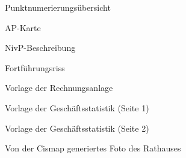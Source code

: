 \begin{figure}[htbp]
	\centering
	\caption{Punktnumerierungsübersicht}
	\label{fig:punktnumerierungsuebersicht}
\end{figure}
\begin{figure}[htbp]
	\centering
	\caption{AP-Karte}
	\label{fig:ap-karte}
\end{figure}
\begin{figure}[htbp]
	\centering
	\caption{NivP-Beschreibung}
	\label{fig:nivp-beschreibung}
\end{figure}
\begin{figure}[htbp]
	\centering
	\caption{Fortführungsriss}
	\label{fig:fortfuehrungsriss}
\end{figure}
\begin{figure}[htbp]
	\centering
	\caption{Vorlage der Rechnungsanlage}
	\label{fig:vorlage_rechnungsanlage}
\end{figure}
\begin{figure}[htbp]
	\centering
	\caption{Vorlage der Geschäftsstatistik (Seite 1)}
	\label{fig:vorlage_geschaeftsstatistik_1}
\end{figure}
\begin{figure}[htbp]
	\centering
	\caption{Vorlage der Geschäftsstatistik (Seite 2)}
	\label{fig:vorlage_geschaeftsstatistik_2}
\end{figure}
\begin{figure}[htbp]
	\centering
	\caption{Von der Cismap generiertes Foto des Rathauses}
	\label{fig:cismap-rathaus}
\end{figure}




